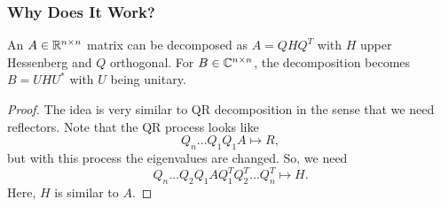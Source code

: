 \documentclass[letterpaper]{article}
\newcommand{\0}{\mathbf{0}}
\begin{document}
\subsubsection{Why Does It Work?}
\begin{theorem}{}{}
    An $A \in \mathbb{R}^{n \times n}$ matrix can be decomposed as $A = QHQ^T$  with $H$ upper Hessenberg and $Q$ orthogonal. For $B \in \mathbb{C}^{n \times n}$, the decomposition becomes $B = UHU^*$ with $U$ being unitary. 
\end{theorem}

\begin{proof}
    The idea is very similar to QR decomposition in the sense that we need reflectors. Note that the QR process looks like \[Q_n \hdots Q_1 Q_1 A \mapsto R,\] but with this process the eigenvalues are changed. So, we need \[Q_n \hdots Q_2 Q_1 A Q_1^T Q_2^T \hdots Q_n^T \mapsto H.\]
    Here, $H$ is similar to $A$. 
\end{proof}
\end{document}
